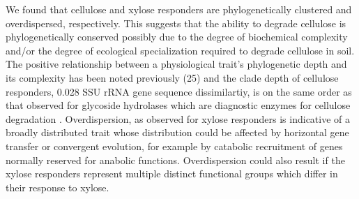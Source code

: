 We found that cellulose and xylose responders are phylogenetically clustered
and overdispersed, respectively. This suggests that the ability to degrade
cellulose is phylogenetically conserved possibly due to the degree of
biochemical complexity and/or the degree of ecological specialization required
to degrade cellulose in soil. The positive relationship between a physiological
trait’s phylogenetic depth and its complexity has been noted previously \citep{}(25)
and the clade depth of cellulose responders, 0.028 SSU rRNA gene sequence
dissimilartiy, is on the same order as that observed for glycoside hydrolases
which are diagnostic enzymes for cellulose degradation \citep{Berlemont2013}.
Overdispersion, as observed for xylose responders is indicative of a broadly
distributed trait whose distribution could be affected by horizontal gene
transfer or convergent evolution, for example by catabolic recruitment of genes
normally reserved for anabolic functions. Overdispersion could also result if
the xylose responders represent multiple distinct functional groups which
differ in their response to xylose. 

